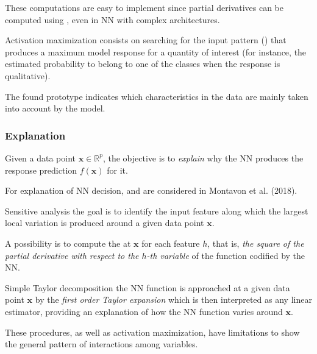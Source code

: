 These computations are easy to implement since partial derivatives can be computed
using , even in NN with complex architectures.

\begin{definition}{Activation maximization}{} consists on searching
    for the input pattern () that produces a maximum
    model response for a quantity of interest
    (for instance, the estimated probability to belong to one of the classes when the response
    is qualitative).

    The found prototype indicates which characteristics in the data are mainly taken into account
    by the model.
\end{definition}

\subsubsection{Explanation}

Given a data point $\boldsymbol x \in \mathds R^p$, the objective is to \emph{explain}
why the NN produces the response prediction $f(\boldsymbol x)$ for it.

For explanation of NN decision,  and
 are considered in Montavon et al. (2018). %

\begin{definition}{Sensitive analysis}{}
    the goal is to identify the input feature along which the largest local variation is produced around
    a given data point $\boldsymbol x$.

    A possibility is to compute the  at $\boldsymbol x$
    for each feature $h$, that is, \emph{the square of the partial derivative with respect to
    the $h$-th variable} of the function codified by the NN.
\end{definition}

\begin{definition}{Simple Taylor decomposition}{}
    the NN function is approached at a given data point $\boldsymbol x$ by the \emph{first
    order Taylor expansion} which is then interpreted as any linear estimator, providing
    an explanation of how the NN function varies around $\boldsymbol x$.
\end{definition}

\begin{note}
    These procedures, as well as activation maximization, have limitations
    to show the general pattern of interactions among variables.
\end{note}

